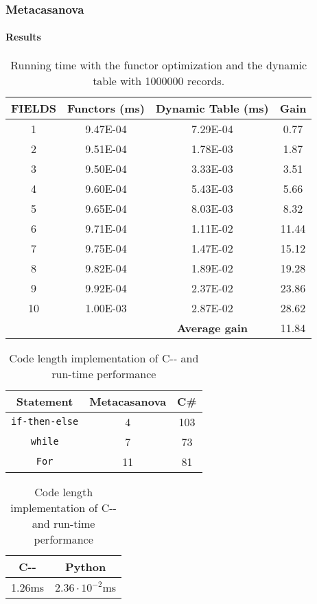 \documentclass[10pt,a4paper]{beamer}
\begin{document}
\begin{frame}
\frametitle{Metacasanova}
\framesubtitle{Results}

\begin{table}
	\centering
	\tiny
	\caption{Running time with the functor optimization and the dynamic table with 1000000 records.}
	\begin{tabular}{|c|c|c|c|}
		\hline
		\textbf{FIELDS}& \textbf{Functors (ms)}&\textbf{Dynamic Table (ms)} & \textbf{Gain}\\ \hline
		1&	9.47E-04&	7.29E-04&	0.77\\ \hline
		2&	9.51E-04&	1.78E-03&	1.87\\ \hline
		3&	9.50E-04&	3.33E-03&	3.51\\ \hline
		4&	9.60E-04&	5.43E-03&	5.66\\ \hline
		5&	9.65E-04&	8.03E-03&	8.32\\ \hline
		6&	9.71E-04&	1.11E-02&	11.44\\ \hline
		7&	9.75E-04&	1.47E-02&	15.12\\ \hline
		8&	9.82E-04&	1.89E-02&	19.28\\ \hline
		9&	9.92E-04&	2.37E-02&	23.86\\ \hline
		10&	1.00E-03&	2.87E-02&	28.62\\ \hline
		\multicolumn{2}{c|}{} & \textbf{Average gain} & 11.84\\ \cline{3-4}						
	\end{tabular}
\end{table}

\begin{table}
	\centering
	\small
	\caption{Code length implementation of C-{}- and run-time performance}
	\begin{tabular}{|c|c|c|}
		\hline
		\textbf{Statement} & \textbf{Metacasanova} & \textbf{C\#}\\
		\hline
		\texttt{if-then-else} & 4 & 103 \\
		\hline
		\texttt{while} & 7 & 73 \\
		\hline
		\texttt{For} & 11 & 81\\
		\hline
	\end{tabular}
	
	\vspace{0.15cm}
	\begin{tabular}{|c|c|}
		\hline
		\textbf{C-{}-} & \textbf{Python} \\
		\hline
		1.26ms & $2.36 \cdot 10^{-2}$ms \\
		\hline
	\end{tabular}
	\label{tab:cmm}
\end{table}

\end{frame}
\end{document}
